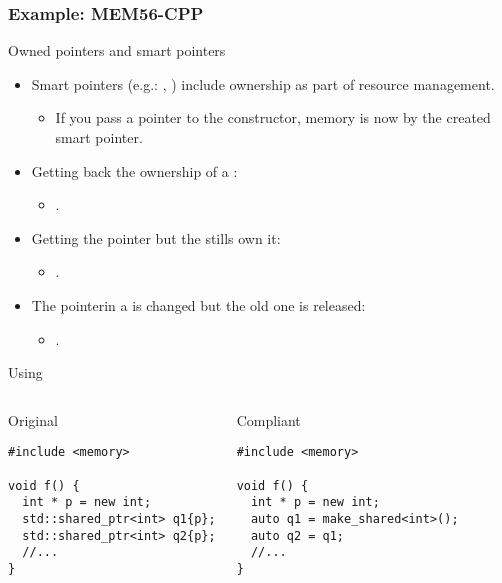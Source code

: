 \subsubsection{Example: MEM56-CPP}

\begin{frame}[t]{Owned pointers and smart pointers}
\begin{itemize}
  \item Smart pointers (e.g.: , )
        include ownership as part of resource management.
    \begin{itemize}
      \item If you pass a pointer to the constructor, memory is now 
            by the created smart pointer.
    \end{itemize}

  \vfill
  \item Getting back the ownership of a :
    \begin{itemize}
      \item {}.
    \end{itemize}

  \vfill 
  \item Getting the pointer but the  stills own it:
    \begin{itemize}
      \item {}.
    \end{itemize}

  \vfill
  \item The pointerin a  is changed but the old one is released:
    \begin{itemize}
      \item {}.
    \end{itemize}    
\end{itemize}
\end{frame}

\begin{frame}[t,fragile]{Using }
\begin{columns}

\begin{block}{Original}
\begin{lstlisting}
#include <memory>

void f() {
  int * p = new int;
  std::shared_ptr<int> q1{p};
  std::shared_ptr<int> q2{p};
  //...
}
\end{lstlisting}
\end{block}

\pause
{}
\begin{block}{Compliant}
\begin{lstlisting}[escapechar=@]
#include <memory>

void f() {
  int * p = new int;
  auto q1 = make_shared<int>();
  auto q2 = q1;
  //...
}
\end{lstlisting}
\end{block}

\end{columns}
\end{frame}

